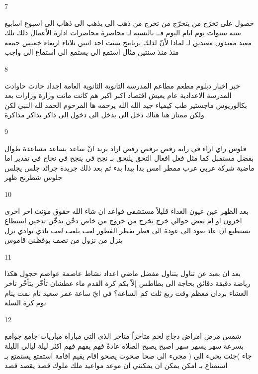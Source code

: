 \documentclass[twocolumn,a4paper]{article}
\newcommand{\prth}[1]{\textenglish{)}#1\textenglish{(}}
\begin{document}
7

\textarabic{ حصول على  
 تخرّج من  يتخرّج من  تخرج من   
 ذهب الى  يذهب الى  ذهاب الى   
 اسبوع  اسابيع  
 سنة  سنوات  
 يوم  ايام  
 اليوم  
 فــ  
 بالنسبة لـ  
 محاضرة  محاضرات
 ادارة اﻷعمال  
 ذلك  تلك  
 معيد  معيدون
  معيدين
  لـ  
 لماذا  
 ﻷنّ  
 لذلك  
 برنامج  
 سبت  
 احد  
 اثنين  
 ثلاثاء  
 اربعاء  
 خميس  
 جمعة  
 منذ  
 منذ سنتين  
 مثال  
 استمع الى  يستمع الى  استماع الى    
 واجب  
}

8

\textarabic{ خبر  اخبار  
 دبلوم  
 مطعم  مطاعم  
 المدرسة الثانوية  
 الثانوية العامة  
 اجداد  
 حادث  حاوادث  
 المدرسة الاعدادية  
 عام  
 يعيش  
 اقتصاد  
 اكبر  
 اكبر هم  
 كانت  
 ماتت  
 وزارة  وزارات
 بعد  
 بكالوريوس  
 ماجستير  
 طب  
 كيمياء  
 جيد  
 الله  
 الله يرحمه  ها  
 المرحوم  
 الحمد لله  
 النبي  
 لكن  ولكن  
 ممتاز  
 هنا  
 هناك  
 دخل الى  يدخل الى  دخول الى    
 ذاكر  يذاكر   مذاكرة   
}

9

\textarabic{ فلوس  
 راي  اراء  
 في رايه  
 رفض  يرفض  رفض   
 اراد  يريد انْ   
 ساعد  يساعد  مساعدة   
 طوال  
 بفضل  
 مستقبل  
 كما  
 مثل  
 فعل  افعال  
 التحق  يلتحق بـ   
 نجح في  ينجح في  نجاح في   
 تقدير  
 اما  
 ماضية  
 شركة  
 عربي  عرب  
 ممطر  
 امس  
 بدا  يبدا  بدء   
 ثم  
 بعد ذلك  
 جريدة  جرائد  
 جلس  يجلس   
 جلوس  
 شطرنج  
 ظهر  
}

10

\textarabic{ بعد الظهر  
 عين  عيون  
 الغداء  
 قليلاً  
 مستشفى  
 قواعد  
 ان شاء الله  
 حقوق  
 مؤنث  
 اخر  اخرى   
 اخرون  
 او  
 ام  
 بعض  
 حوالي  
 خرج  يخرج من   
 خروج من  
 خاص  
 دخّن  يدخّن   
 تدخين  
 استطاع  يستطيع ان   
 عاد  يعود الى   
 عودة الى  
 فطر  يفطر  
 الفطور  
 لعب  يلعب   
 لعب  
 نادي  نوادي  
 نزل  ينزل من   
 نزول من  
 نصف  
 يوقظني  
 قاموس  
}

11

\textarabic{ بعد ان  
 بعيد عن  
 تناول  يتناول   
 مفضل  
 ماضي  
 اعداد  
 نشاط   
 عاصمة  عواصم  
 خجول  
 هكذا  
 رياضة  
 دقيقة  دقائق  
 بحاجة الى  
 بطاطس  
 إلاّ  
 بكم  
 كرة القدم  
 ماء  
 عطشان  
 تأخّر  يتأخّر   
 تاخر  
 العشاء  
 بردان  
 معظم  
 وقت  
 ربع  
 ثلث  
 كم الساعة؟  
 في ايّ ساعة  
 عمر  
 سعيد  
 نام  نمت  ينام   
 نوم  
 كرة السلة  
}

12

\textarabic{ شمس  
 مرض  امراض  
 دجاج  
 لحم  
 متاخراً  
 متاخر  
 الذي  التي  
 مباراة  مباريات  
 جامع  جوامع  
 بسرعة  
 سهر  يسهر   
 سهر  
 اصبح  يصبح  
 الصلاة  
 عادةً  
 فهم  يفهم   
 فهم  
 اكثر  
 ليلة  ليالي  
 الليلة  
 جاء \prth{جئت يجيء الى }  
 مجيء الى  
 صحا  صحوت  يصحو   
 اقام  يقيم   
 اقامة  
 استمتع  يستمتع بـ   استمتاع بـ   
 امكن  يمكن ان  
 يمكنني ان  
 موعد  مواعيد  
 ملك  ملوك  
 قصد  يقصد   
 قصد  
}
\end{document}
